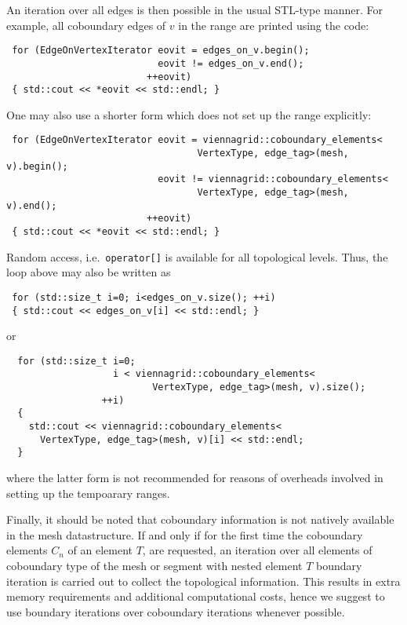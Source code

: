 An iteration over all edges is then possible in the usual STL-type manner. For example, all coboundary edges of $v$ in the range are printed using the code:
\begin{lstlisting}
 for (EdgeOnVertexIterator eovit = edges_on_v.begin();
                           eovit != edges_on_v.end();
                         ++eovit)
 { std::cout << *eovit << std::endl; }
\end{lstlisting}
One may also use a shorter form which does not set up the range explicitly:
\begin{lstlisting}
 for (EdgeOnVertexIterator eovit = viennagrid::coboundary_elements<
                                  VertexType, edge_tag>(mesh, v).begin();
                           eovit != viennagrid::coboundary_elements<
                                  VertexType, edge_tag>(mesh, v).end();
                         ++eovit)
 { std::cout << *eovit << std::endl; }
\end{lstlisting}

Random access, i.e.~\lstinline|operator[]| is available for all topological levels. Thus, the loop above may also be written as
\begin{lstlisting}
 for (std::size_t i=0; i<edges_on_v.size(); ++i)
 { std::cout << edges_on_v[i] << std::endl; }
\end{lstlisting}
or
\begin{lstlisting}
  for (std::size_t i=0;
                   i < viennagrid::coboundary_elements<
                          VertexType, edge_tag>(mesh, v).size();
                 ++i)
  {
    std::cout << viennagrid::coboundary_elements<
      VertexType, edge_tag>(mesh, v)[i] << std::endl;
  }
\end{lstlisting}
where the latter form is not recommended for reasons of overheads involved in setting up the tempoarary ranges.

Finally, it should be noted that coboundary information is not natively available in the mesh datastructure.
If and only if for the first time the coboundary elements $C_n$ of an element $T$, are requested, an iteration over all elements of coboundary type of the mesh or segment with nested element $T$ boundary iteration is carried out to collect the topological information.
This results in extra memory requirements and additional computational costs, hence we suggest to use boundary iterations over coboundary iterations whenever possible.



